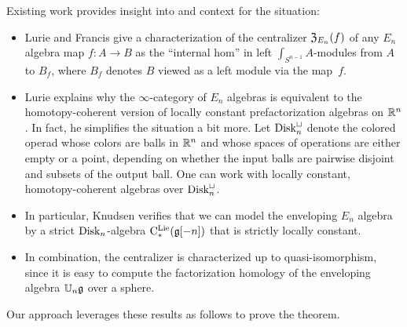 \documentclass[11pt]{amsart}
\numberwithin{equation}{section}
\begin{document}
\def\Disk{{\rm Disk}}

Existing work provides insight into and context for the situation:
\begin{itemize}
\item Lurie and Francis give a characterization of the centralizer ${\frak Z}_{E_n}(f)$ of any $E_n$ algebra map $f: A \to B$ as the ``internal hom'' in left $\int_{S^{n-1}}A$-modules from $A$ to $B_f$, where $B_f$ denotes $B$ viewed as a left module via the map~$f$.
\item Lurie \cite{LurieHA} explains why the $\infty$-category of $E_n$ algebras is equivalent to the homotopy-coherent version of locally constant prefactorization algebras on $\mathbb R^n$.  
In fact, he simplifies the situation a bit more. 
Let $\Disk_n^\sqcup$ denote the colored operad whose colors are balls in $\mathbb R^n$ and whose spaces of operations are either empty or a point, depending on whether the input balls are pairwise disjoint and subsets of the output ball. 
One can work with locally constant, homotopy-coherent algebras over $\Disk_n^\sqcup$.
\item In particular, Knudsen verifies that we can model the enveloping $E_n$ algebra by a strict $\Disk_n$-algebra ${\rm C}^{\rm Lie}_*(\mathfrak g[-n])$ that is strictly locally constant.
\item In combination, the centralizer is characterized up to quasi-isomorphism, 
since it is easy to compute the factorization homology of the enveloping algebra $\mathbb U_n \mathfrak g$ over a sphere.
\end{itemize}
Our approach leverages these results as follows to prove the theorem.
\end{document}
